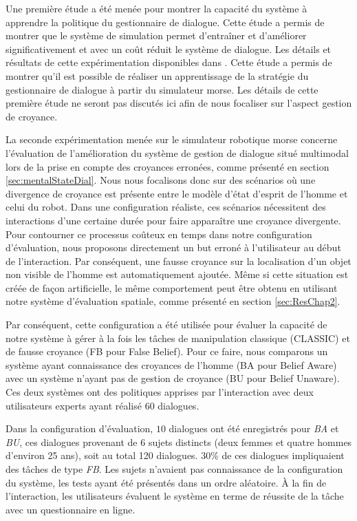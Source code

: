 \documentclass[a4paper,11pt,twoside]{StyleThese}
\begin{document}
Une première étude a été menée pour montrer la capacité du système à apprendre la politique du gestionnaire de dialogue. Cette étude a permis de montrer que le système de simulation permet d'entraîner et d'améliorer significativement et avec un coût réduit le système de dialogue. Les détails et résultats de cette expérimentation disponibles dans \cite{simpar_2014}. Cette étude a permis de montrer qu'il est possible de réaliser un apprentissage de la stratégie du gestionnaire de dialogue à partir du simulateur morse. Les détails de cette première étude ne seront pas discutés ici afin de nous focaliser sur l'aspect gestion de croyance.

La seconde expérimentation menée sur le simulateur robotique morse concerne l'évaluation de l'amélioration du système de gestion de dialogue situé multimodal lors de la prise en compte des croyances erronées, comme présenté en section \ref{sec:mentalStateDial}.
Nous nous focalisons donc sur des scénarios où une divergence de croyance est présente entre le modèle d'état d'esprit de l'homme et celui du robot. 
Dans une configuration réaliste, ces scénarios nécessitent des interactions d'une certaine durée pour faire apparaître une croyance divergente. Pour contourner ce processus coûteux en temps dans notre configuration d'évaluation, nous proposons directement un but erroné à l'utilisateur au début de l'interaction. 
Par conséquent, une fausse croyance sur la localisation d'un objet non visible de l'homme est automatiquement ajoutée. Même si cette situation est créée de façon artificielle, le même comportement peut être obtenu en utilisant notre système d'évaluation spatiale, comme présenté en section \ref{sec:ResChap2}.

Par conséquent, cette configuration a été utilisée pour évaluer la capacité de notre système à gérer à la fois les tâches de manipulation classique (CLASSIC) et de fausse croyance (FB pour False Belief).
Pour ce faire, nous comparons un système ayant connaissance des croyances de l'homme (BA pour Belief Aware) avec un système n'ayant pas de gestion de croyance (BU pour Belief Unaware). Ces deux systèmes ont des politiques apprises par l'interaction avec deux utilisateurs experts ayant réalisé $60$ dialogues.

Dans la configuration d'évaluation, $10$ dialogues ont été enregistrés pour \textit{BA} et \textit{BU}, ces dialogues provenant de 6 sujets distincts (deux femmes et quatre hommes d'environ 25 ans), soit au total 120 dialogues. $30$\% de ces dialogues impliquaient des tâches de type \textit{FB}. Les sujets n'avaient pas connaissance de la configuration du système, les tests ayant été présentés dans un ordre aléatoire. À la fin de l'interaction, les utilisateurs évaluent le système en terme de réussite de la tâche avec un questionnaire en ligne.
\end{document}
